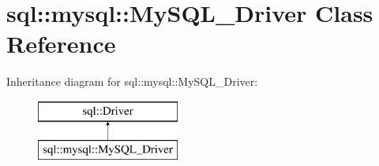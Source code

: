 \hypertarget{classsql_1_1mysql_1_1_my_s_q_l___driver}{}\section{sql\+:\+:mysql\+:\+:My\+S\+Q\+L\+\_\+\+Driver Class Reference}
\label{classsql_1_1mysql_1_1_my_s_q_l___driver}
Inheritance diagram for sql\+:\+:mysql\+:\+:My\+S\+Q\+L\+\_\+\+Driver\+:\begin{figure}[H]
\begin{center}
\leavevmode
\includegraphics[height=2.000000cm]{classsql_1_1mysql_1_1_my_s_q_l___driver}
\end{center}
\end{figure}

